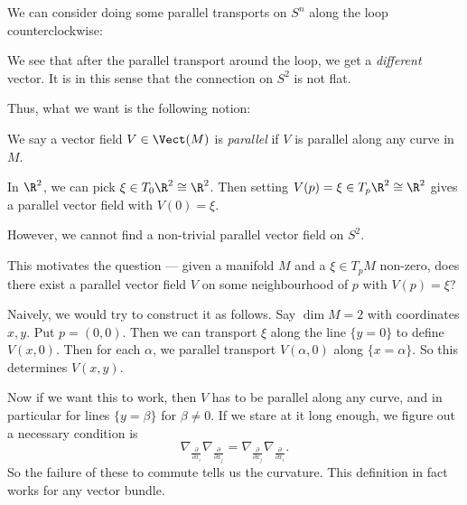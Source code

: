 \documentclass[a4paper]{article}
\begin{document}
We can consider doing some parallel transports on $S^n$ along the loop counterclockwise:
\begin{center}
\end{center} %
We see that after the parallel transport around the loop, we get a \emph{different} vector. It is in this sense that the connection on $S^2$ is not flat.

Thus, what we want is the following notion:
\begin{defi}
  We say a vector field $V \in \Vect(M)$ is \emph{parallel} if $V$ is parallel along any curve in $M$.
\end{defi}

\begin{eg}
  In $\R^2$, we can pick $\xi \in T_0\R^2 \cong \R^2$. Then setting $V(p) = \xi \in T_p \R^2 \cong \R^2$ gives a parallel vector field with $V(0) = \xi$.
\end{eg}

However, we cannot find a non-trivial parallel vector field on $S^2$.

This motivates the question --- given a manifold $M$ and a $\xi \in T_p M$ non-zero, does there exist a parallel vector field $V$ on some neighbourhood of $p$ with $V(p) = \xi$?

Naively, we would try to construct it as follows. Say $\dim M = 2$ with coordinates $x, y$. Put $p = (0, 0)$. Then we can transport $\xi$ along the line $\{y = 0\}$ to define $V(x, 0)$. Then for each $\alpha$, we parallel transport $V(\alpha, 0)$ along $\{x = \alpha\}$. So this determines $V(x, y)$.

Now if we want this to work, then $V$ has to be parallel along any curve, and in particular for lines $\{y = \beta\}$ for $\beta \not= 0$. If we stare at it long enough, we figure out a necessary condition is
\[
  \nabla_{\frac{\partial}{\partial x_i}} \nabla_{\frac{\partial}{\partial x_j}} = \nabla_{\frac{\partial}{\partial x_j}} \nabla_{\frac{\partial}{\partial x_i}}.
\]
So the failure of these to commute tells us the curvature. This definition in fact works for any vector bundle.
\end{document}
